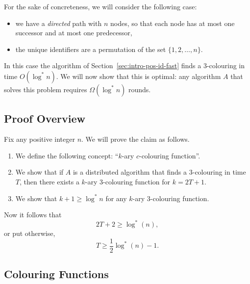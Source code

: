 For the sake of concreteness, we will consider the following case:
\begin{itemize}
    \item we have a \emph{directed} path with $n$ nodes, so that each node has at most one successor and at most one predecessor,
    \item the unique identifiers are a permutation of the set $\{1,2,\dotsc,n\}$.
\end{itemize}
In this case the algorithm of Section~\ref{sec:intro-pos-id-fast} finds a $3$-colouring in time $O(\log^* n)$. We will now show that this is optimal: any algorithm $A$ that solves this problem requires $\Omega(\log^* n)$ rounds.


\subsection{Proof Overview}

Fix any positive integer $n$. We will prove the claim as follows.
\begin{enumerate}
    \item We define the following concept: ``$k$-ary $c$-colouring function''.
    \item We show that if $A$ is a distributed algorithm that finds a $3$-colouring in time $T$, then there exists a $k$-ary $3$-colouring function for $k = 2T+1$.
    \item We show that $k + 1 \ge \log^* n$ for any $k$-ary $3$-colouring function.
\end{enumerate}
Now it follows that
\[
    2T + 2 \ge \log^*(n),
\]
or put otherwise,
\[
    T \ge \frac{1}{2}\log^*(n) - 1.
\]


\subsection{Colouring Functions}

